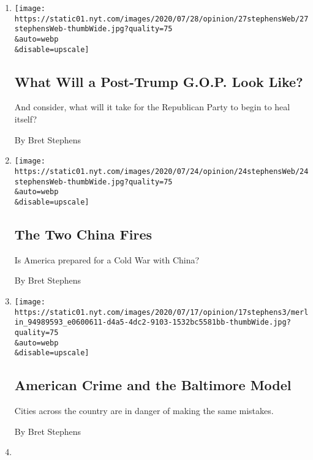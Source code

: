 \begin{enumerate}
\def\labelenumi{\arabic{enumi}.}
\item
  \href{/2020/07/27/opinion/trump-2020.html}{}

  \texttt{[image: https://static01.nyt.com/images/2020/07/28/opinion/27stephensWeb/27stephensWeb-thumbWide.jpg?quality=75\\\&auto=webp\\\&disable=upscale]}

  \hypertarget{what-will-a-post-trump-gop-look-like}{%
  \subsection{What Will a Post-Trump G.O.P. Look
  Like?}\label{what-will-a-post-trump-gop-look-like}}

  And consider, what will it take for the Republican Party to begin to
  heal itself?

  By Bret Stephens
\item
  \href{/2020/07/24/opinion/china-trump.html}{}

  \texttt{[image: https://static01.nyt.com/images/2020/07/24/opinion/24stephensWeb/24stephensWeb-thumbWide.jpg?quality=75\\\&auto=webp\\\&disable=upscale]}

  \hypertarget{the-two-china-fires}{%
  \subsection{The Two China Fires}\label{the-two-china-fires}}

  Is America prepared for a Cold War with China?

  By Bret Stephens
\item
  \href{/2020/07/17/opinion/policing-crime-baltimore.html}{}

  \texttt{[image: https://static01.nyt.com/images/2020/07/17/opinion/17stephens3/merlin\_94989593\_e0600611-d4a5-4dc2-9103-1532bc5581bb-thumbWide.jpg?quality=75\\\&auto=webp\\\&disable=upscale]}

  \hypertarget{american-crime-and-the-baltimore-model}{%
  \subsection{American Crime and the Baltimore
  Model}\label{american-crime-and-the-baltimore-model}}

  Cities across the country are in danger of making the same mistakes.

  By Bret Stephens
\item
  \href{/2020/07/03/opinion/orwell-fourth-of-july.html}{}


\end{enumerate}
